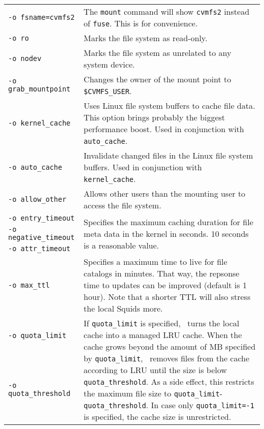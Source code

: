 \begin{table}
	\begin{center}
		\begin{tabularx}{\linewidth}{lX}
			\lstinline{-o fsname=cvmfs2} & The \lstinline{mount} command will show \lstinline{cvmfs2} instead of \lstinline{fuse}. This is for convenience. \\
			\lstinline{-o ro} & Marks the file system as read-only. \\
			\lstinline{-o nodev} & Marks the file system as unrelated to any system device. \\
			\lstinline{-o grab_mountpoint} & Changes the owner of the mount point to \texttt{\$CVMFS\_USER}. \\
			\lstinline{-o kernel_cache} & Uses Linux file system buffers to cache file data. This option brings probably the biggest performance boost. Used in conjunction with \lstinline{auto_cache}. \\
			\lstinline{-o auto_cache} & Invalidate changed files in the Linux file system buffers.  Used in conjunction with \lstinline{kernel_cache}.\\
			\lstinline{-o allow_other} & Allows other users than the mounting user to access the file system. \\
			\lstinline{-o entry_timeout} & \multirow{3}{\linewidth}{Specifies the maximum caching duration for file meta data in the kernel in seconds.  10 seconds is a reasonable value.}\\
			\lstinline{-o negative_timeout} & \\
			\lstinline{-o attr_timeout} & \\
			\lstinline{-o max_ttl} & Specifies a maximum time to live for file catalogs in minutes.  That way, the repsonse time to updates can be improved (default is 1 hour).  Note that a shorter TTL will also stress the local Squids more.\\
			\lstinline{-o quota_limit} & \multirow{7}{\linewidth}{If \lstinline{quota_limit} is specified, \cvmfs\ turns the local cache into a managed LRU cache. When the cache grows beyond the amount of MB specified by \lstinline{quota_limit}, \cvmfs\ removes files from the cache according to LRU until the size is below \lstinline{quota_threshold}. As a side effect, this restricts the maximum file size to \lstinline{quota_limit}-\lstinline{quota_threshold}.  In case only \lstinline{quota_limit=-1} is specified, the cache size is unrestricted.}\\
			\lstinline{-o quota_threshold} & \\

\end{tabularx}
\end{center}
\end{table}

